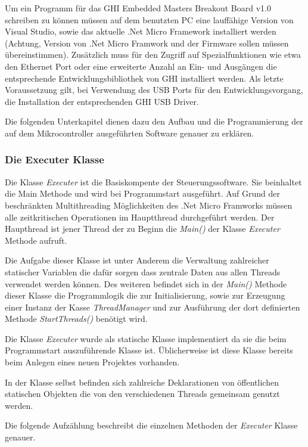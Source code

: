Um ein Programm für das GHI Embedded Masters Breakout Board v1.0 schreiben zu können müssen auf dem benutzten PC eine lauffähige Version von Visual Studio, sowie das aktuelle .Net Micro Framework installiert werden (Achtung, Version von .Net Micro Framwork und der Firmware sollen müssen übereinstimmen). Zusätzlich muss für den Zugriff auf Spezialfunktionen wie etwa den Ethernet Port oder eine erweiterte Anzahl an Ein- und Ausgängen die entsprechende Entwicklungsbibliothek von GHI installiert werden. Als letzte Voraussetzung gilt, bei Verwendung des USB Ports für den Entwicklungsvorgang, die Installation der entsprechenden GHI USB Driver.  

Die folgenden Unterkapitel dienen dazu den Aufbau und die Programmierung der auf dem Mikrocontroller ausgeführten Software genauer zu erklären.

\subsubsection{Die Executer Klasse}
Die Klasse \textit{Executer} ist die Basiskompente der Steuerungssoftware. Sie beinhaltet die Main Methode und wird bei Programmstart ausgeführt.
Auf Grund der beschränkten Multithreading Möglichkeiten des .Net Micro Framworks müssen alle zeitkritischen Operationen im Hauptthread durchgeführt werden. Der Haupthread ist jener Thread der zu Beginn die \textit{Main()} der Klasse \textit{Executer} Methode aufruft.

Die Aufgabe dieser Klasse ist unter Anderem die Verwaltung zahlreicher statischer Variablen die dafür sorgen dass zentrale Daten aus allen Threads verwendet werden können.
Des weiteren befindet sich in der \textit{Main()} Methode dieser Klasse die Programmlogik die zur Initialisierung, sowie zur Erzeugung einer Instanz der Kasse \textit{ThreadManager} und zur Ausführung der dort definierten Methode \textit{StartThreads()} benötigt wird.

Die Klasse \textit{Executer} wurde als statische Klasse implementiert da sie die beim Programmstart auszuführende Klasse ist. Üblicherweise ist diese Klasse bereits beim Anlegen eines neuen Projektes vorhanden.

In der Klasse selbst befinden sich zahlreiche Deklarationen von öffentlichen statischen Objekten die von den verschiedenen Threads gemeinsam genutzt werden.

Die folgende Aufzählung beschreibt die einzelnen Methoden der \textit{Executer} Klasse genauer.

